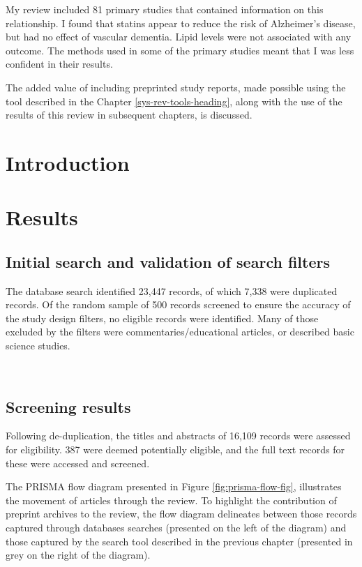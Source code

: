 \documentclass[a4paper, twoside]{templates/ociamthesis}
\begin{document}
My review included 81 primary studies that contained information on this relationship. I found that statins appear to reduce the risk of Alzheimer's disease, but had no effect of vascular dementia. Lipid levels were not associated with any outcome. The methods used in some of the primary studies meant that I was less confident in their results.

The added value of including preprinted study reports, made possible using the tool described in the Chapter \ref{sys-rev-tools-heading}, along with the use of the results of this review in subsequent chapters, is discussed.

\hypertarget{introduction-1}{%
\section{Introduction}\label{introduction-1}}

\hypertarget{results}{%
\section{Results}\label{results}}

\hypertarget{initial-search-and-validation-of-search-filters}{%
\subsection{Initial search and validation of search filters}\label{initial-search-and-validation-of-search-filters}}

The database search identified 23,447 records, of which 7,338 were duplicated records. Of the random sample of 500 records screened to ensure the accuracy of the study design filters, no eligible records were identified. Many of those excluded by the filters were commentaries/educational articles, or described basic science studies.

~

\hypertarget{screening-results}{%
\subsection{Screening results}\label{screening-results}}

Following de-duplication, the titles and abstracts of 16,109 records were assessed for eligibility. 387 were deemed potentially eligible, and the full text records for these were accessed and screened.

The PRISMA flow diagram presented in Figure \ref{fig:prisma-flow-fig}, illustrates the movement of articles through the review. To highlight the contribution of preprint archives to the review, the flow diagram delineates between those records captured through databases searches (presented on the left of the diagram) and those captured by the search tool described in the previous chapter (presented in grey on the right of the diagram).
\end{document}
